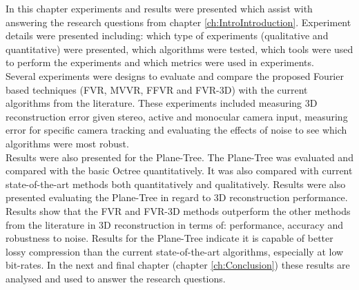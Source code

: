 In this chapter experiments and results were presented which assist with answering the research questions from chapter \ref{ch:IntroIntroduction}. Experiment details were presented including: which type of experiments (qualitative and quantitative) were presented, which algorithms were tested, which tools were used to perform the experiments and which metrics were used in experiments. \\

Several experiments were designs to evaluate and compare the proposed Fourier based techniques (FVR, MVVR, FFVR and FVR-3D) with the current algorithms from the literature. These experiments included measuring 3D reconstruction error given stereo, active and monocular camera input, measuring error for specific camera tracking and evaluating the effects of noise to see which algorithms were most robust. \\

Results were also presented for the Plane-Tree. The Plane-Tree was evaluated and compared with the basic Octree quantitatively. It was also compared with current state-of-the-art methods both quantitatively and qualitatively. Results were also presented evaluating the Plane-Tree in regard to 3D reconstruction performance. \\

Results show that the FVR and FVR-3D methods outperform the other methods from the literature in 3D reconstruction in terms of: performance, accuracy and robustness to noise. Results for the Plane-Tree indicate it is capable of better lossy compression than the current state-of-the-art algorithms, especially at low bit-rates. In the next and final chapter (chapter \ref{ch:Conclusion}) these results are analysed and used to answer the research questions. \\


